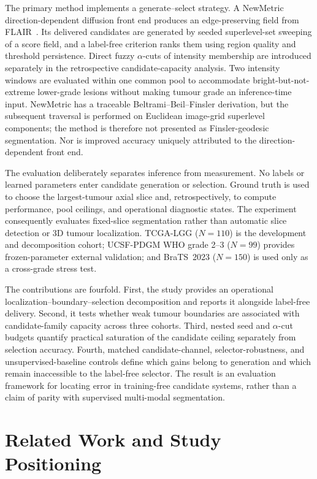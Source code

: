 \documentclass[11pt,a4paper]{article}
\begin{document}
The primary method implements a generate--select strategy. A
NewMetric direction-dependent diffusion front end produces an edge-preserving
field from FLAIR~\cite{kilic2022}. Its delivered candidates are generated by
seeded superlevel-set sweeping of a score field, and a label-free criterion ranks
them using region quality and threshold persistence. Direct fuzzy $\alpha$-cuts
of intensity membership are introduced separately in the retrospective
candidate-capacity analysis. Two intensity
windows are evaluated within one common pool to accommodate bright-but-not-extreme
lower-grade lesions without making tumour grade an inference-time input. NewMetric
has a traceable Beltrami--Beil--Finsler derivation, but the subsequent traversal is
performed on Euclidean image-grid superlevel components; the method is therefore
not presented as Finsler-geodesic segmentation. Nor is improved accuracy uniquely
attributed to the direction-dependent front end.

The evaluation deliberately separates inference from measurement. No labels or
learned parameters enter candidate generation or selection. Ground truth is used
to choose the largest-tumour axial slice and, retrospectively, to compute
performance, pool ceilings, and operational diagnostic states. The experiment consequently
evaluates fixed-slice segmentation rather than automatic slice detection or 3D
tumour localization. TCGA-LGG ($N=110$) is the development and decomposition
cohort; UCSF-PDGM WHO grade 2--3 ($N=99$) provides frozen-parameter external
validation; and BraTS~2023 ($N=150$) is used only as a cross-grade stress test.

The contributions are fourfold. First, the study provides an operational
localization--boundary--selection decomposition and reports it alongside
label-free delivery. Second, it tests whether weak tumour boundaries are
associated with candidate-family capacity across three cohorts. Third, nested
seed and $\alpha$-cut budgets quantify practical saturation of the candidate
ceiling separately from selection accuracy. Fourth, matched candidate-channel,
selector-robustness, and unsupervised-baseline controls define which gains belong
to generation and which remain inaccessible to the label-free selector. The
result is an evaluation framework for locating error in training-free candidate
systems, rather than a claim of parity with supervised multi-modal segmentation.

\section{Related Work and Study Positioning}\label{sec:related}
\end{document}
